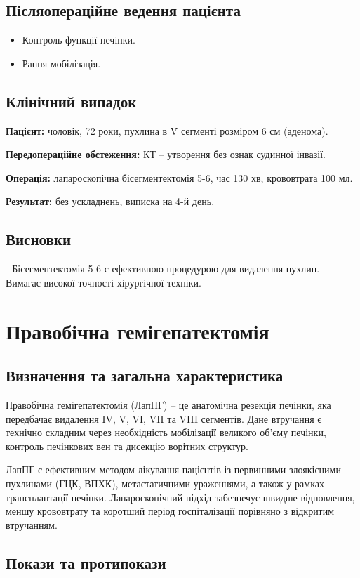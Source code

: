 \begin{refsection}
\subsection{Післяопераційне ведення пацієнта}
\begin{itemize}
    \item Контроль функції печінки.
    \item Рання мобілізація.
\end{itemize}

\subsection{Клінічний випадок}
\textbf{Пацієнт:} чоловік, 72 роки, пухлина в V сегменті розміром 6 см (аденома).

\textbf{Передопераційне обстеження:} КТ – утворення без ознак судинної інвазії.

\textbf{Операція:} лапароскопічна бісегментектомія 5-6, час 130 хв, крововтрата 100 мл.

\textbf{Результат:} без ускладнень, виписка на 4-й день.

\subsection{Висновки}
- Бісегментектомія 5-6 є ефективною процедурою для видалення пухлин.
- Вимагає високої точності хірургічної техніки.

\section{Правобічна гемігепатектомія}
\subsection{Визначення та загальна характеристика}
Правобічна гемігепатектомія (ЛапПГ) – це анатомічна резекція печінки, яка передбачає видалення IV, V, VI, VII та VIII сегментів. Дане втручання є технічно складним через необхідність мобілізації великого об’єму печінки, контроль печінкових вен та дисекцію ворітних структур.

ЛапПГ є ефективним методом лікування пацієнтів із первинними злоякісними пухлинами (ГЦК, ВПХК), метастатичними ураженнями, а також у рамках трансплантації печінки. Лапароскопічний підхід забезпечує швидше відновлення, меншу крововтрату та коротший період госпіталізації порівняно з відкритим втручанням.

\subsection{Покази та протипокази}

\end{refsection}
